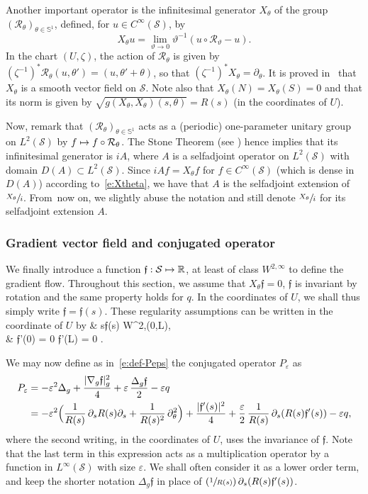 \documentclass[JEP,XML,SOM,Unicode]{cedram}
\newcommand\mto{\mathchoice{\longmapsto}{\mapsto}{\mapsto}{\mapsto}}
\newcommand{\Psfrac}[2]{(\sfrac{#1}{#2})}
\theoremstyle{definition}
\newcommand{\calR}{\ensuremath{\mathcal R}}
\newcommand{\calS}{\ensuremath{\mathcal S}}
\newcommand{\mb}[1]{\ensuremath{\mathbb{#1}}}
\newcommand{\R}{{\mb{R}}}
\newcommand{\bS}{\ensuremath{\mathbb S}}
\newcommand{\f}{\ensuremath{\mathfrak{f}}}
\def\baln#1\naln{\begin{align}#1\end{align}}
\newcommand\Lap{\Delta_{g}}
\newcommand\nablag{\nabla_{g}}
\let\d\partial
\let\eps\varepsilon
\let\q q
\begin{document}
Another important operator is the infinitesimal generator $X_\theta$ of the group $(\calR_\theta)_{\theta \in \bS^1}$, defined, for $u \in C^\infty(\calS)$, by
\begin{equation}
\label{e:Xtheta}
X_\theta u = \lim_{\vartheta \to 0} \vartheta^{-1} (u \circ \calR_\vartheta -u).
\end{equation}
In the chart $(U, \zeta)$, the action of $\calR_\theta$ is given by $(\zeta^{-1})^* \calR_\theta (u, \theta') = (u, \theta' +\theta)$, so that $(\zeta^{-1})^* X_\theta = \d_\theta$.
It is proved in~\cite[\S 3.2]{LL:18} that $X_\theta$ is a smooth vector field on $\calS$.
Note also that $X_\theta(N) = X_\theta(S)=0$ and that its norm is given by $\sqrt{g(X_\theta, X_\theta) (s, \theta)}= R(s)$ (in the coordinates of $U$).

Now, remark that $(\calR_\theta)_{\theta \in \bS^1}$ acts as a (periodic) one-parameter unitary group on $L^2(\calS)$ by $f \mto f\circ \calR_\theta$. The Stone Theorem (see \eg \cite[Th.\,VIII-8, p.\,266]{RS:I}) hence implies that its infinitesimal generator is $i A$, where $A$ is a selfadjoint operator on $L^2(\calS)$ with domain $D(A) \subset L^2(\calS)$. Since $i Af = X_\theta f$ for $f \in C^\infty(\calS)$ (which is dense in $D(A)$) according to~\eqref{e:Xtheta}, we have that $A$ is the selfadjoint extension of $\sfrac{X_\theta}{i}$. From~now on, we slightly abuse the notation and still denote $\sfrac{X_\theta}{i}$ for its selfadjoint extension $A$.

\subsubsection*{Gradient vector field and conjugated operator}
We finally introduce a function $\f : \calS \mto \R$, at least of class $W^{2,\infty}$ to define the gradient flow. Throughout this section, we assume that $X_\theta \f = 0$, \ie $\f$ is invariant by rotation and the same property holds for $q$. In the coordinates of $U$, we shall thus simply write $\f=\f(s)$. These regularity assumptions can be written in the coordinate of $U$ by
\baln
\label{e:reg-f}
& s\mto \f(s) \in W^{2,\infty}(0,L),  \nonumber\\
& \f'(0) = 0  \quad
{} \f'(L) = 0 .
\naln

We may now define as in~\eqref{e:def-Peps} the conjugated operator $P_\eps$ as
\begin{align}
\label{e:defPeps}
P_\eps & = - \eps^2 \Lap + \frac{|\nablag \f|_g^2}{4} + \eps\, \frac{\Lap \f}{2} -\eps \q\nonumber \\
& = - \eps^2 \Bigl( \frac{1}{R(s)}\, \d_s R(s) \d_s + \frac{1}{R(s)^2}\, \d_\theta^2 \Bigr) + \frac{|\f'(s)|^2}{4} + \frac{\eps}{2}\, \frac{1}{R(s)}\, \d_s (R(s)\f'(s)) -\eps \q,
\end{align}
where the second writing, in the coordinates of $U$, uses the invariance of $\f$. Note that the last term in this expression acts as a multiplication operator by a function in $L^\infty(\calS)$ with size $\eps$. We shall often consider it as a lower order term, and keep the shorter notation $\Lap \f$ in place of $\Psfrac{1}{R(s)}\, \d_s (R(s)\f'(s))$.
\end{document}
